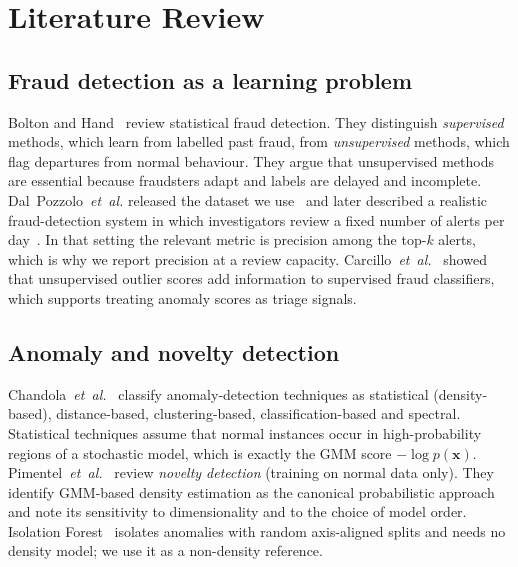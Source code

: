 \documentclass[12pt]{article}
\begin{document}
\section{Literature Review}\label{sec:lit}

\subsection{Fraud detection as a learning problem}
Bolton and Hand~\cite{bolton2002} review statistical fraud detection. They distinguish \emph{supervised} methods,
which learn from labelled past fraud, from \emph{unsupervised} methods, which flag departures from normal behaviour.
They argue that unsupervised methods are essential because fraudsters adapt and labels are delayed and incomplete.
Dal~Pozzolo~\emph{et~al.} released the dataset we use~\cite{dalpozzolo2015} and later described a realistic
fraud-detection system in which investigators review a fixed number of alerts per day~\cite{dalpozzolo2018}. In that
setting the relevant metric is precision among the top-$k$ alerts, which is why we report precision at a review
capacity. Carcillo~\emph{et~al.}~\cite{carcillo2021} showed that unsupervised outlier scores add information to
supervised fraud classifiers, which supports treating anomaly scores as triage signals.

\subsection{Anomaly and novelty detection}
Chandola~\emph{et~al.}~\cite{chandola2009} classify anomaly-detection techniques as statistical (density-based),
distance-based, clustering-based, classification-based and spectral. Statistical techniques assume that normal
instances occur in high-probability regions of a stochastic model, which is exactly the GMM score $-\log p(\mathbf{x})$.
Pimentel~\emph{et~al.}~\cite{pimentel2014} review \emph{novelty detection} (training on normal data only). They
identify GMM-based density estimation as the canonical probabilistic approach and note its sensitivity to
dimensionality and to the choice of model order. Isolation Forest~\cite{liu2008} isolates anomalies with random
axis-aligned splits and needs no density model; we use it as a non-density reference.
\end{document}
